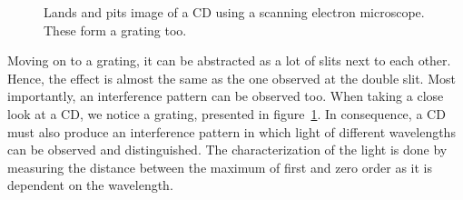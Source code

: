 \begin{minipage}{0.99\linewidth}
\begin{minipage}{0.25\linewidth}
\begin{scriptsize}
\begin{center}
\begin{figure}[H]
                    \caption{Lands and pits image of a CD using a scanning electron microscope. These form a grating too. \cite{src_cd}}
                    \label{fig_lands_pits}
                \end{figure}
            \end{center}
            \end{scriptsize}
        \end{minipage}
    \end{minipage}

    Moving on to a grating, it can be abstracted as a lot of slits next to each other.
    Hence, the effect is almost the same as the one observed at the double slit.
    Most importantly, an interference pattern can be observed too.
    When taking a close look at a CD, we notice a grating, presented in figure~\ref{fig_lands_pits}.
    In consequence, a CD must also produce an interference pattern in which light of different wavelengths can be observed and distinguished.
    The characterization of the light is done by measuring the distance between the maximum of first and zero order as it is dependent on the wavelength.

